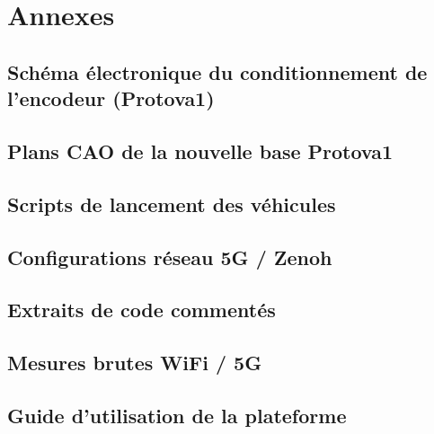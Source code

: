 \chapter{Annexes}
\chapminitoc


\section{Schéma électronique du conditionnement de l'encodeur (Protova1)}

\section{Plans CAO de la nouvelle base Protova1}

\section{Scripts de lancement des véhicules}

\section{Configurations réseau 5G / Zenoh}

\section{Extraits de code commentés}

\section{Mesures brutes WiFi / 5G}

\section{Guide d'utilisation de la plateforme}
